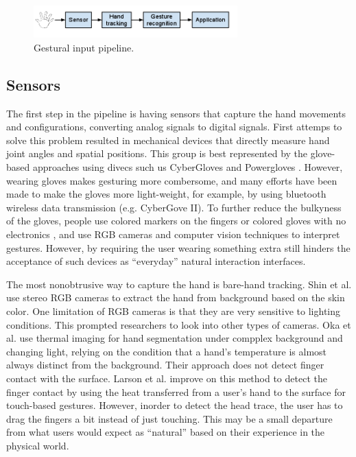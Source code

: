 \begin{figure}[h]
  \centering
  \includegraphics[width=0.7\textwidth]{figures/pipeline.png} 
  \caption{Gestural input pipeline.}
  \label{fig:pipeline}
\end{figure}

\subsection{Sensors}
The first step in the pipeline is having sensors that capture the hand movements
and configurations, converting analog signals to digital signals. First attemps
to solve this problem resulted in mechanical devices that directly measure hand
joint angles and spatial positions. This group is best represented by the
glove-based approaches using divecs such us CyberGloves \cite{fels09} and
Powergloves \cite{kadous02}. However, wearing gloves makes gesturing more
combersome, and many efforts have been made to make the gloves more
light-weight, for example, by using bluetooth wireless data transmission (e.g.
CyberGove II). To further reduce the bulkyness of the gloves, people use colored markers on the fingers
\cite{mistry09} or colored gloves with no electronics \cite{Wang09}, and use RGB
cameras and computer vision techniques to interpret gestures. However, by
requiring the user wearing something extra still hinders the acceptance of
such devices as ``everyday'' natural interaction interfaces. 

The most nonobtrusive way to capture the hand is bare-hand tracking. Shin et al. \cite{Shin04} use
stereo RGB cameras to extract the hand from background based on the skin color. One
limitation of RGB cameras is that they are very sensitive to lighting
conditions. This prompted researchers to look into other types of cameras. Oka et al. 
\cite{Oka02} use thermal imaging for hand segmentation under compplex
background and changing light, relying on the condition that a hand's
temperature is almost always distinct from the background. Their approach does
not detect finger contact with the surface. Larson et al. \cite{larson11}
improve on this method to detect the finger contact by using
the heat transferred from a user's hand to the surface for touch-based gestures.
However, inorder to detect the head trace, the user has to drag the fingers a
bit instead of just touching. This may be a small departure from what users
would expect as ``natural'' based on their experience in the physical world.

